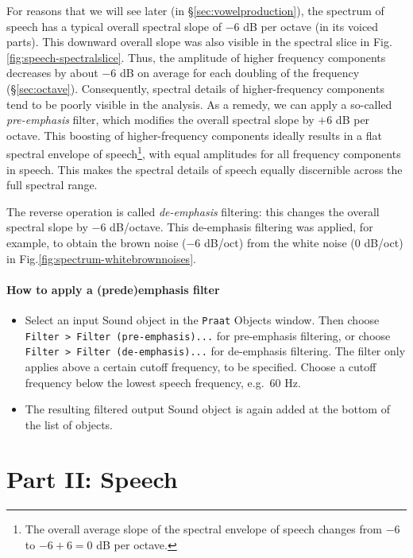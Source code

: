 \documentclass[
]{book}
\begin{document}
For reasons that we will see later (in §\ref{sec:vowelproduction}), the spectrum of speech has a typical overall spectral slope of \(-6\) dB per octave (in its voiced parts). This downward overall slope was also visible in the spectral slice in Fig.\ref{fig:speech-spectralslice}. Thus, the amplitude of higher frequency components decreases by about \(-6\) dB on average for each doubling of the frequency (§\ref{sec:octave}).
Consequently, spectral details of higher-frequency components tend to be poorly visible in the analysis. As a remedy, we can apply a so-called \emph{pre-emphasis} filter, which modifies the overall spectral slope by \(+6\) dB per octave. This boosting of higher-frequency components ideally results in a flat spectral envelope of speech\footnote{The overall average slope of the spectral envelope of speech changes from \(-6\) to \(-6+6=0\) dB per octave.}, with equal amplitudes for all frequency components in speech. This makes the spectral details of speech equally discernible across the full spectral range.

The reverse operation is called \emph{de-emphasis} filtering: this changes the overall spectral slope by \(-6\) dB/octave. This de-emphasis filtering was applied, for example, to obtain the brown noise (\(-6\) dB/oct) from the white noise (\(0\) dB/oct) in Fig.\ref{fig:spectrum-whitebrownnoises}.

\protect{}\label{box-praatemphasis}
\subsection{How to apply a (pre\textbar de)emphasis filter}\label{how-to-apply-a-predeemphasis-filter}

\begin{itemize}
\item
  Select an input Sound object in the \texttt{Praat} Objects window. Then choose \texttt{Filter\ \textgreater{}\ Filter\ (pre-emphasis)...} for pre-emphasis filtering, or choose \texttt{Filter\ \textgreater{}\ Filter\ (de-emphasis)...} for de-emphasis filtering. The filter only applies above a certain cutoff frequency, to be specified. Choose a cutoff frequency below the lowest speech frequency, e.g.~60 Hz.
\item
  The resulting filtered output Sound object is again added at the bottom of the list of objects.
\end{itemize}

\part*{Part II: Speech}\label{part-part-ii-speech}
\end{document}
